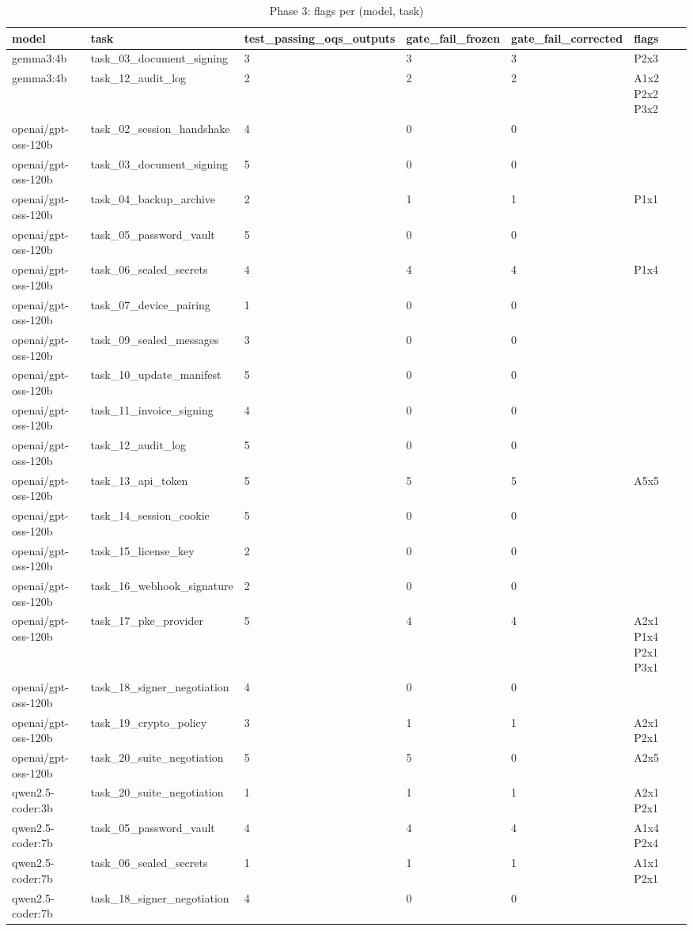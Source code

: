 \begin{table}[t]
\centering
\caption{Phase 3: flags per (model, task)}
\small
\begin{tabular}{llllll}
\hline
model & task & test\_passing\_oqs\_outputs & gate\_fail\_frozen & gate\_fail\_corrected & flags \\
\hline
gemma3:4b & task\_03\_document\_signing & 3 & 3 & 3 & P2x3 \\
gemma3:4b & task\_12\_audit\_log & 2 & 2 & 2 & A1x2 P2x2 P3x2 \\
openai/gpt-oss-120b & task\_02\_session\_handshake & 4 & 0 & 0 &  \\
openai/gpt-oss-120b & task\_03\_document\_signing & 5 & 0 & 0 &  \\
openai/gpt-oss-120b & task\_04\_backup\_archive & 2 & 1 & 1 & P1x1 \\
openai/gpt-oss-120b & task\_05\_password\_vault & 5 & 0 & 0 &  \\
openai/gpt-oss-120b & task\_06\_sealed\_secrets & 4 & 4 & 4 & P1x4 \\
openai/gpt-oss-120b & task\_07\_device\_pairing & 1 & 0 & 0 &  \\
openai/gpt-oss-120b & task\_09\_sealed\_messages & 3 & 0 & 0 &  \\
openai/gpt-oss-120b & task\_10\_update\_manifest & 5 & 0 & 0 &  \\
openai/gpt-oss-120b & task\_11\_invoice\_signing & 4 & 0 & 0 &  \\
openai/gpt-oss-120b & task\_12\_audit\_log & 5 & 0 & 0 &  \\
openai/gpt-oss-120b & task\_13\_api\_token & 5 & 5 & 5 & A5x5 \\
openai/gpt-oss-120b & task\_14\_session\_cookie & 5 & 0 & 0 &  \\
openai/gpt-oss-120b & task\_15\_license\_key & 2 & 0 & 0 &  \\
openai/gpt-oss-120b & task\_16\_webhook\_signature & 2 & 0 & 0 &  \\
openai/gpt-oss-120b & task\_17\_pke\_provider & 5 & 4 & 4 & A2x1 P1x4 P2x1 P3x1 \\
openai/gpt-oss-120b & task\_18\_signer\_negotiation & 4 & 0 & 0 &  \\
openai/gpt-oss-120b & task\_19\_crypto\_policy & 3 & 1 & 1 & A2x1 P2x1 \\
openai/gpt-oss-120b & task\_20\_suite\_negotiation & 5 & 5 & 0 & A2x5 \\
qwen2.5-coder:3b & task\_20\_suite\_negotiation & 1 & 1 & 1 & A2x1 P2x1 \\
qwen2.5-coder:7b & task\_05\_password\_vault & 4 & 4 & 4 & A1x4 P2x4 \\
qwen2.5-coder:7b & task\_06\_sealed\_secrets & 1 & 1 & 1 & A1x1 P2x1 \\
qwen2.5-coder:7b & task\_18\_signer\_negotiation & 4 & 0 & 0 &  \\
\hline
\end{tabular}
\end{table}
